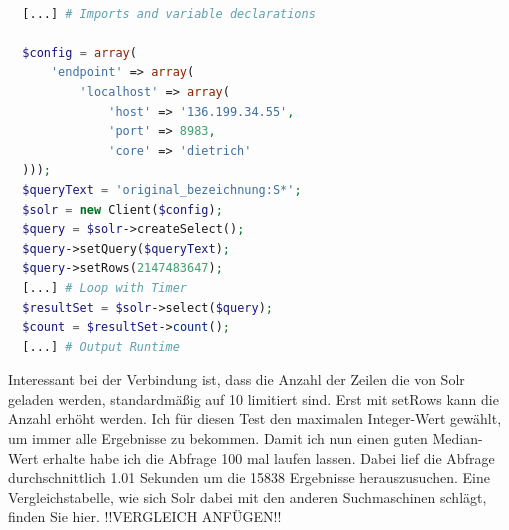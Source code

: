 \begin{lstlisting}[language=php, frame=single, label={lst:managedSchema}, 
  morekeywords={type,uninvertible,indexed,stored,field,multiValued, name}] 

  [...] # Imports and variable declarations

  $config = array(
      'endpoint' => array(
          'localhost' => array(
              'host' => '136.199.34.55',
              'port' => 8983,
              'core' => 'dietrich'
  )));
  $queryText = 'original_bezeichnung:S*';
  $solr = new Client($config);
  $query = $solr->createSelect();
  $query->setQuery($queryText);
  $query->setRows(2147483647); 
  [...] # Loop with Timer
  $resultSet = $solr->select($query);
  $count = $resultSet->count();
  [...] # Output Runtime
\end{lstlisting}

Interessant bei der Verbindung ist, dass die Anzahl der Zeilen die von Solr geladen werden, standardmäßig auf 10 limitiert sind. Erst mit setRows kann die Anzahl erhöht werden. Ich für diesen Test den maximalen Integer-Wert gewählt, um immer alle Ergebnisse zu bekommen. Damit ich nun einen guten Median-Wert erhalte habe ich die Abfrage 100 mal laufen lassen. Dabei lief die Abfrage durchschnittlich 1.01 Sekunden um die 15838 Ergebnisse herauszusuchen. Eine Vergleichstabelle, wie sich Solr dabei mit den anderen Suchmaschinen schlägt, finden Sie hier. !!VERGLEICH ANFÜGEN!!
